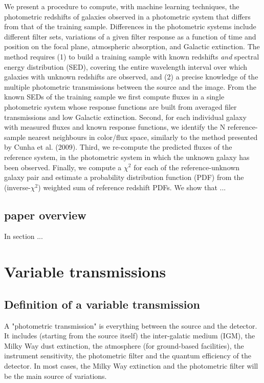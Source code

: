 \documentclass[11pt]{article}
\begin{document}
We present a procedure to compute, with machine learning techniques, the
photometric redshifts of galaxies observed in a photometric system that
differs from that of the training sample. Differences in the photometric
systems include different filter sets, variations of a given filter
response as a function of time and position on the focal plane,
atmospheric absorption, and Galactic extinction. The method requires (1)
to build a training sample with known redshifts \emph{and} spectral
energy distribution (SED), covering the entire wavelength interval over
which galaxies with unknown redshifts are observed, and (2) a precise
knowledge of the multiple photometric transmissions between the source
and the image. From the known SEDs of the training sample we first
compute fluxes in a single photometric system whose response functions
are built from averaged filer transmissions and low Galactic extinction.
Second, for each individual galaxy with measured fluxes and known
response functions, we identify the N reference-sample nearest
neighbours in color/flux space, similarly to the method presented by
Cunha et al. (2009). Third, we re-compute the predicted fluxes of the
reference system, in the photometric system in which the unknown galaxy
has been observed. Finally, we compute a \(\chi^2\) for each of the
reference-unknown galaxy pair and estimate a probability distribution
function (PDF) from the (inverse-\(\chi^2\)) weighted sum of reference
redshift PDFs. We show that ...

\subsection{paper overview}\label{paper-overview}

In section ...

    \section{Variable transmissions}\label{variable-transmissions}

\subsection{Definition of a variable
transmission}\label{definition-of-a-variable-transmission}

A "photometric transmission" is everything between the source and the
detector. It includes (starting from the source itself) the
inter-galatic medium (IGM), the Milky Way dust extinction, the
atmosphere (for ground-based facilities), the instrument sensitivity,
the photometric filter and the quantum efficiency of the detector. In
most cases, the Milky Way extinction and the photometric filter will be
the main source of variations.
\end{document}
